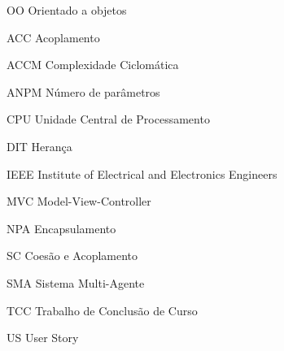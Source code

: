 \begin{siglas}

\item [OO] Orientado a objetos
\item [ACC] Acoplamento
\item [ACCM] Complexidade Ciclomática
\item [ANPM] Número de parâmetros
\item [CPU] Unidade Central de Processamento
\item [DIT] Herança
\item [IEEE] Institute of Electrical and Electronics Engineers
\item [MVC] Model-View-Controller
\item [NPA] Encapsulamento
\item [SC] Coesão e Acoplamento
\item [SMA] Sistema Multi-Agente
\item [TCC] Trabalho de Conclusão de Curso
\item [US] User Story
\end{siglas}
